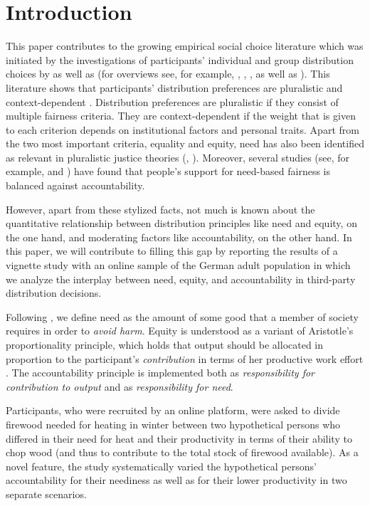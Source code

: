 \documentclass[smallcondensed]{svjour3}
\begin{document}
\section{Introduction}\label{sec:introduction}
%
This paper contributes to the growing empirical social choice literature which was initiated by the investigations of participants' individual and group distribution choices by \citet{yaari_dividing_1984} as well as \citet{frohlich_choices_1987} (for overviews see, for example, \citealt{konow_which_2003}, \citealt{traub_friedman_2005}, \citealt{konow_is_2009}, as well as \citealt{gaertner_empirical_2012}). This literature shows that participants' distribution preferences are pluralistic and context-dependent \citep{konow_economics_2016}. Distribution preferences are pluralistic if they consist of multiple fairness criteria. They are context-dependent if the weight that is given to each criterion depends on institutional factors and personal traits. Apart from the two most important criteria, equality and equity, need has also been identified as relevant in pluralistic justice theories (\citealt{konow_fair_2001, konow_which_2003}, \citealt{nicklisch_need_2020}). Moreover, several studies (see, for example, \citealt{konow_fair_2001} and \citealt{schwettmann_trading_2009}) have found that people's support for need-based fairness is balanced against accountability.\par
%
However, apart from these stylized facts, not much is known about the quantitative relationship between distribution principles like need and equity, on the one hand, and moderating factors like accountability, on the other hand. In this paper, we will contribute to filling this gap by reporting the results of a vignette study with an online sample of the German adult population in which we analyze the interplay between need, equity, and accountability in third-party distribution decisions.\par
%
Following \citep{miller_principles_1999}, we define need as the amount of some good that a member of society requires in order to \textit{avoid harm}. Equity is understood as a variant of Aristotle's proportionality principle, which holds that output should be allocated in proportion to the participant's \textit{contribution} in terms of her productive work effort \citep{konow_positive_1996}. The accountability principle \citep{konow_fair_2001} is implemented both as \textit{responsibility for contribution to output} and as \textit{responsibility for need}.\par
%
Participants, who were recruited by an online platform, were asked to divide firewood needed for heating in winter between two hypothetical persons who differed in their need for heat and their productivity in terms of their ability to chop wood (and thus to contribute to the total stock of firewood available). As a novel feature, the study systematically varied the hypothetical persons' accountability for their neediness as well as for their lower productivity in two separate scenarios.\par
\end{document}
